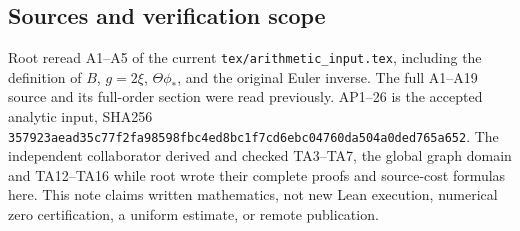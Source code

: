 \subsection{Sources and verification scope}\label{TA-sources-and-verification-scope}

Root reread A1--A5 of the current \texttt{tex/arithmetic\_input.tex}, including the
definition of \(B\), \(g=2\xi\), \(\Theta\phi_*\), and the original Euler inverse. The full
A1--A19 source and its full-order section were read previously. AP1--26 is the
accepted analytic input, SHA256
\nolinkurl{357923aead35c77f2fa98598fbc4ed8bc1f7cd6ebc04760da504a0ded765a652}.
The independent collaborator derived and checked TA3--TA7, the global graph
domain and TA12--TA16 while root wrote their complete proofs and source-cost
formulas here. This note claims written mathematics, not new Lean execution,
numerical zero certification, a uniform estimate, or remote publication.
